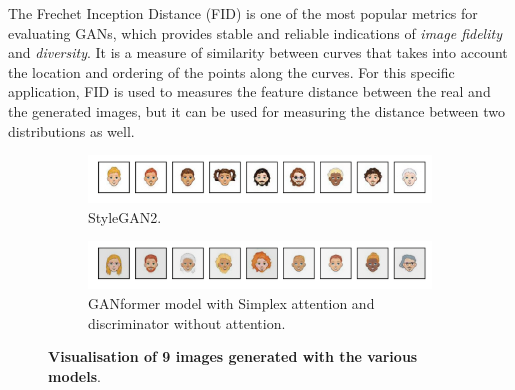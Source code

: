 \documentclass{article}
\begin{document}
	The Frechet Inception Distance (FID) is one of the most popular metrics for evaluating GANs, which 
	provides stable and reliable indications of \textit{image fidelity} and \textit{diversity}. 
	It is a measure of similarity between curves that takes into account the location and ordering of the 
	points along the curves. 
	For this specific application, FID is used to measures the feature distance between the real and the 
	generated images, but it can be used for measuring the distance between two distributions as well.

	\begin{figure}[htpb]
		\centering
		\begin{subfigure}{\linewidth}
			\includegraphics[width=\linewidth]{../src/trained_network/out_imgs/random_Stylegan2_300kimg.png}
			\vspace{-7mm}
			\caption{StyleGAN2.} 
		\end{subfigure}
		\begin{subfigure}{\linewidth}
			\includegraphics[width=\linewidth]{../src/trained_network/out_imgs/random_GANFormer_Simplex_D_StyleGAN_300kimg.png}
			\vspace{-7mm}
			\caption{GANformer model with Simplex attention and discriminator without attention.}
		\end{subfigure}
		\vspace{3mm}
		\caption{\textbf{Visualisation of 9 images generated with the various models}.}\label{fig:random}
	\end{figure}
\end{document}
